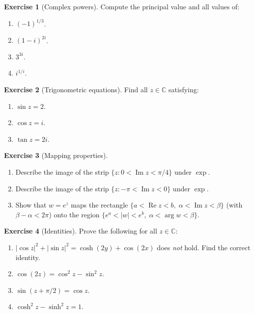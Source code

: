 \documentclass[12pt,a4paper,openany]{book}
\theoremstyle{definition}
\newtheorem{exercise}{Exercise}[chapter]
\theoremstyle{plain}
\theoremstyle{remark}
\newcommand{\C}{\mathbb{C}}
\DeclareMathOperator{\re}{Re}
\DeclareMathOperator{\im}{Im}
\newcommand{\abs}[1]{\left|#1\right|}
\begin{document}
\begin{exercise}[Complex powers]\label{exo:complex-powers}
Compute the principal value and all values of:
\begin{enumerate}[label=\textup{(\alph*)}]
  \item $(-1)^{1/3}$.
  \item $(1-i)^{2i}$.
  \item $3^{3i}$.
  \item $i^{1/i}$.
\end{enumerate}
\end{exercise}

\begin{exercise}[Trigonometric equations]\label{exo:trig-equations}
Find all $z\in\C$ satisfying:
\begin{enumerate}[label=\textup{(\alph*)}]
  \item $\sin z = 2$.
  \item $\cos z = i$.
  \item $\tan z = 2i$.
\end{enumerate}
\end{exercise}

\begin{exercise}[Mapping properties]\label{exo:exp-mapping}
\leavevmode
\begin{enumerate}[label=\textup{(\alph*)}]
  \item Describe the image of the strip
    $\{z : 0<\im z<\pi/4\}$ under $\exp$.
  \item Describe the image of the strip
    $\{z : -\pi<\im z<0\}$ under $\exp$.
  \item Show that $w = e^z$ maps the rectangle
    $\{a<\re z<b,\;\alpha<\im z<\beta\}$ (with $\beta-\alpha<2\pi$)
    onto the region $\{e^a<\abs{w}<e^b,\;\alpha<\arg w<\beta\}$.
\end{enumerate}
\end{exercise}

\begin{exercise}[Identities]\label{exo:trig-identities}
Prove the following for all $z\in\C$:
\begin{enumerate}[label=\textup{(\alph*)}]
  \item $\abs{\cos z}^2+\abs{\sin z}^2 = \cosh(2y)+\cos(2x)$
    does \emph{not} hold.  Find the correct identity.
  \item $\cos(2z) = \cos^2 z - \sin^2 z$.
  \item $\sin(z+\pi/2) = \cos z$.
  \item $\cosh^2 z - \sinh^2 z = 1$.
\end{enumerate}
\end{exercise}
\end{document}
